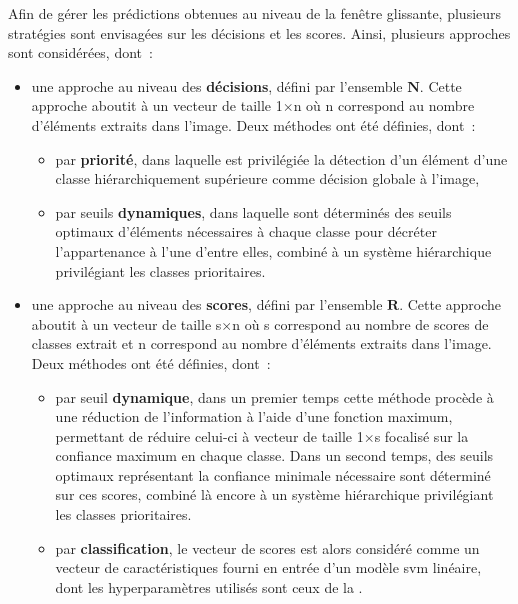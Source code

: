 Afin de gérer les prédictions obtenues au niveau de la fenêtre glissante, plusieurs stratégies sont envisagées sur les décisions et les scores. Ainsi, plusieurs approches sont considérées, dont~:
\begin{itemize}
    \item   une approche au niveau des \textbf{décisions}, défini par l'ensemble $\mathbf{N}$. Cette approche aboutit à un vecteur de taille 1$\times$n où n correspond au nombre d'éléments extraits dans l'image. Deux méthodes ont été définies, dont~: 
            \begin{itemize}
                \item par \textbf{priorité}, dans laquelle est privilégiée la détection d'un élément d'une classe hiérarchiquement supérieure comme décision globale à l'image,
                \item par seuils \textbf{dynamiques}, dans laquelle sont déterminés des seuils optimaux d'éléments nécessaires à chaque classe pour décréter l'appartenance à l'une d'entre elles, combiné à un système hiérarchique privilégiant les classes prioritaires.
            \end{itemize}
    \item   une approche au niveau des \textbf{scores}, défini par l'ensemble $\mathbf{R}$. Cette approche aboutit à un vecteur de taille s$\times$n où s correspond au nombre de scores de classes extrait et n correspond au nombre d'éléments extraits dans l'image. Deux méthodes ont été définies, dont~: 
            \begin{itemize}
                \item par seuil \textbf{dynamique}, dans un premier temps cette méthode procède à une réduction de l'information à l'aide d'une fonction maximum, permettant de réduire celui-ci à vecteur de taille 1$\times$s focalisé sur la confiance maximum en chaque classe. Dans un second temps, des seuils optimaux représentant la confiance minimale nécessaire sont déterminé sur ces scores, combiné là encore à un système hiérarchique privilégiant les classes prioritaires.
                \item par \textbf{classification}, le vecteur de scores est alors considéré comme un vecteur de caractéristiques fourni en entrée d'un modèle \gls{svm} linéaire, dont les hyperparamètres utilisés sont ceux de la .
            \end{itemize}
\end{itemize}\par

